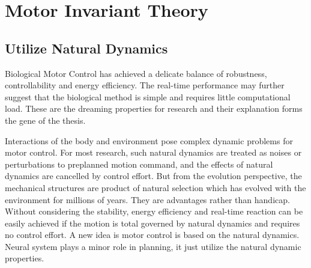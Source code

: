 %

\section{Motor Invariant Theory}
\subsection{Utilize Natural Dynamics}
Biological Motor Control has achieved a delicate balance of robustness, controllability and energy efficiency.
The real-time performance may further suggest that the biological method  is simple and requires little computational load.
These are the dreaming properties for \cms research and  their explanation  forms the gene of the thesis.



Interactions of the body and environment pose  complex dynamic problems for motor control.
For most \cms research, such natural dynamics are treated as noises or perturbations to preplanned motion command, and the  effects  of natural dynamics are cancelled by control effort.
But from the evolution perspective, the mechanical structures are product of natural selection which has evolved with the environment for millions of years. 
They are advantages rather than handicap. 
Without considering the stability, energy efficiency and real-time reaction can be easily achieved if the motion is total governed by natural dynamics and requires no control effort.
A new idea is motor control is based on the natural dynamics.
Neural system plays a minor role in planning, it just utilize the natural dynamic properties.

